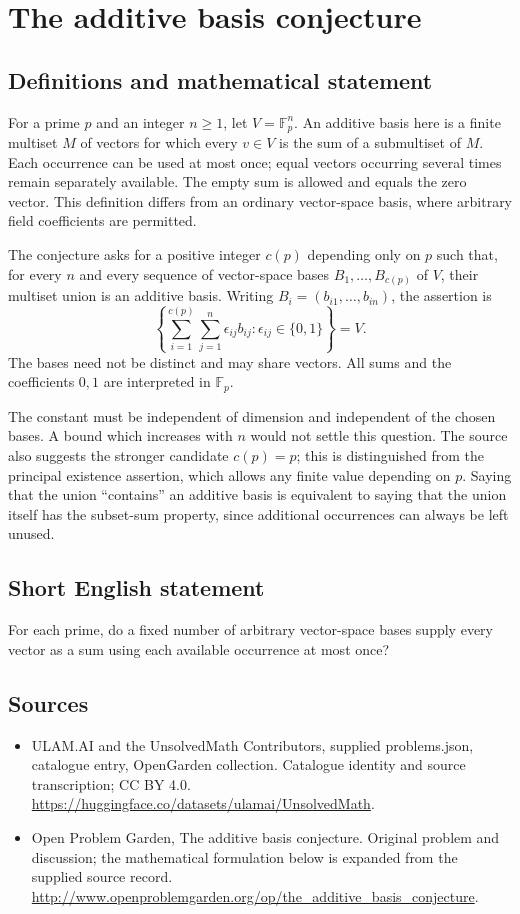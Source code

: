 \documentclass[11pt,a4paper]{article}
\begin{document}
\section*{The additive basis conjecture}\label{statement}

\subsection{Definitions and mathematical statement}
For a prime $p$ and an integer $n\ge1$, let $V=\mathbb F_p^n$.
An additive basis here is a finite multiset $M$ of vectors for which every
$v\in V$ is the sum of a submultiset of $M$. Each occurrence can be used
at most once; equal vectors occurring several times remain separately
available. The empty sum is allowed and equals the zero vector.
This definition differs from an ordinary vector-space basis, where
arbitrary field coefficients are permitted.

The conjecture asks for a positive integer $c(p)$ depending only on $p$
such that, for every $n$ and every sequence of vector-space bases
$B_1,\ldots,B_{c(p)}$ of $V$, their multiset union is an additive basis.
Writing $B_i=(b_{i1},\ldots,b_{in})$, the assertion is
\[
 \left\{\sum_{i=1}^{c(p)}\sum_{j=1}^n
                 \epsilon_{ij}b_{ij}:\epsilon_{ij}\in\{0,1\}\right\}=V.
\]
The bases need not be distinct and may share vectors. All sums and the
coefficients $0,1$ are interpreted in $\mathbb F_p$.

The constant must be independent of dimension and independent of the
chosen bases. A bound which increases with $n$ would not settle this
question. The source also suggests the stronger candidate $c(p)=p$;
this is distinguished from the principal existence assertion, which
allows any finite value depending on $p$. Saying that the union
``contains'' an additive basis is equivalent to saying that the union
itself has the subset-sum property, since additional occurrences can
always be left unused.
\subsection{Short English statement}
For each prime, do a fixed number of arbitrary vector-space bases supply every vector as a sum using each available occurrence at most once?
\subsection{Sources}
\begin{itemize}
\item[S1] ULAM.AI and the UnsolvedMath Contributors, supplied problems.json, catalogue entry, OpenGarden collection. Catalogue identity and source transcription; CC BY 4.0.
\url{https://huggingface.co/datasets/ulamai/UnsolvedMath}.
\item[S2] Open Problem Garden, The additive basis conjecture. Original problem and discussion; the mathematical formulation below is expanded from the supplied source record.
\url{http://www.openproblemgarden.org/op/the_additive_basis_conjecture}.
\end{itemize}
\end{document}

